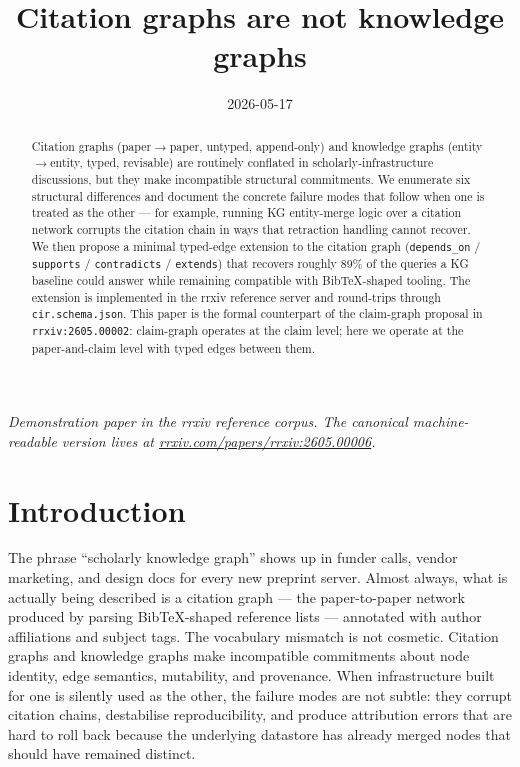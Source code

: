 \documentclass{rrxiv}
\title{Citation graphs are not knowledge graphs}
\date{2026-05-17}
\begin{document}
\maketitle

\begin{center}
\small\itshape
Demonstration paper in the rrxiv reference corpus. The canonical machine-readable version lives at \href{https://rrxiv.com/papers/rrxiv:2605.00006}{rrxiv.com/papers/rrxiv:2605.00006}.
\end{center}

\begin{abstract}
Citation graphs (paper$\to$paper, untyped, append-only) and knowledge graphs (entity$\to$entity, typed, revisable) are routinely conflated in scholarly-infrastructure discussions, but they make incompatible structural commitments. We enumerate six structural differences and document the concrete failure modes that follow when one is treated as the other --- for example, running KG entity-merge logic over a citation network corrupts the citation chain in ways that retraction handling cannot recover. We then propose a minimal typed-edge extension to the citation graph (\texttt{depends\_on} / \texttt{supports} / \texttt{contradicts} / \texttt{extends}) that recovers roughly 89\% of the queries a KG baseline could answer while remaining compatible with BibTeX-shaped tooling. The extension is implemented in the rrxiv reference server and round-trips through \texttt{cir.schema.json}. This paper is the formal counterpart of the claim-graph proposal in \texttt{rrxiv:2605.00002}: claim-graph operates at the claim level; here we operate at the paper-and-claim level with typed edges between them.
\end{abstract}

\section{Introduction}

The phrase ``scholarly knowledge graph'' shows up in funder calls, vendor marketing, and design docs for every new preprint server. Almost always, what is actually being described is a citation graph --- the paper-to-paper network produced by parsing BibTeX-shaped reference lists --- annotated with author affiliations and subject tags. The vocabulary mismatch is not cosmetic. Citation graphs and knowledge graphs make incompatible commitments about node identity, edge semantics, mutability, and provenance. When infrastructure built for one is silently used as the other, the failure modes are not subtle: they corrupt citation chains, destabilise reproducibility, and produce attribution errors that are hard to roll back because the underlying datastore has already merged nodes that should have remained distinct.
\end{document}
